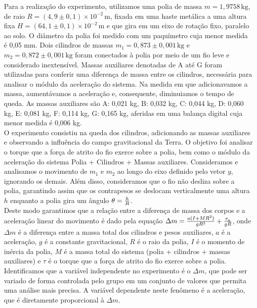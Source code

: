 \documentclass[a4papper, 10pt]{article}
\begin{document}
Para a realização do experimento, utilizamos uma polia de massa \( m = 1,9758 \, \text{kg} \), de raio \( R = (4,9 \pm  0,1) \times 10^{-2} \, \text{m} \), fixada em uma haste metálica a uma altura fixa \( H = (64,1 \pm 0,1) \times 10^{-2} \, \text{m} \) e que gira em um eixo de rotação fixo, paralelo ao solo. O diâmetro da polia foi medido com um paquímetro cuja menor medida é 0,05 mm. Dois cilindros de massas \( m_1 = 0,873 \pm 0,001 \, \text{kg} \) e \( m_2 = 0,872 \pm 0,001 \, \text{kg} \) foram conectados à polia por meio de um fio leve e considerado inextensível. Massas auxiliares denotadas de A até G foram utilizadas para conferir uma diferença de massa entre os cilindros, necessária para analisar o módulo da aceleração do sistema. 
Na medida em que adicionavamos a massa, aumentávamos a aceleração e, consequente, diminuiamos o tempo de queda. As massas auxiliares são A: 0,021 kg, B: 0,032 kg, C: 0,044 kg, D: 0,060 kg, E: 0,081 kg, F: 0,114 kg, G: 0,165 kg, aferidas em uma balança digital cuja menor medida é 0,006 kg.
\\
\indent O experimento consistiu na queda dos cilindros, adicionando as massas auxiliares e observando a influência do campo gravitacional da Terra. O objetivo foi analisar o torque que a força de atrito do fio exerce sobre a polia, bem como o módulo da aceleração do sistema Polia + Cilindros + Massas auxiliares. Consideramos e analisamos o movimento de \(m_1\) e \(m_2\) ao longo do eixo definido pelo vetor \(y\), ignorando os demais. Além disso, consideramos que o fio não desliza sobre a polia, garantindo assim que os contrapesos se deslocam verticalmente uma altura \(h\) enquanto a polia gira um ângulo \(\large \theta = \frac{h}{R}\). 
\\
\indent Deste modo garantimos que a relação entre a diferença de massa dos corpos e a aceleração linear do movimento é dado pela equação $\Delta m = \frac{\large a (I + MR^2)}{gR^2} + \frac{\large \tau_a}{gR}$, 
onde \(\Delta m\) é a diferença entre a massa total dos cilindros e pesos auxiliares, \(a\) é a aceleração, \(g\) é a constante gravitacional, \(R\) é o raio da polia, \(I\) é o momento de inércia da polia, \(M\) é a massa total do sistema (polia + cilindros + massas auxiliares) e \(\tau\) é o torque que a força de atrito do fio exerce sobre a polia.
Identificamos que a variável independente no experimento é o \(\Delta m\), que pode ser variado de forma controlada pelo grupo em um conjunto de valores que permita uma análise mais precisa. A variável dependente neste fenômeno é a aceleração, que é diretamente proporcional à \(\Delta m\).
\vspace{0.25cm}
\end{document}
